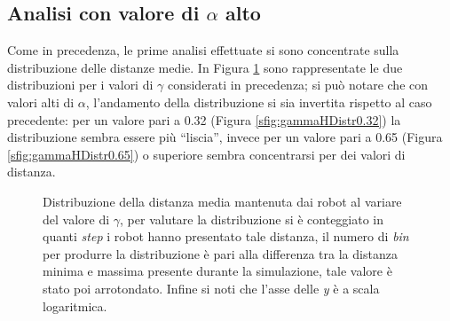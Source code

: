 \subsection{Analisi con valore di $\alpha$ alto}
\label{subsec:gammaahigh}
Come in precedenza, le prime analisi effettuate si sono concentrate sulla distribuzione delle distanze medie.
In Figura \ref{fig:gammaHDistr} sono rappresentate le due distribuzioni per i valori di $\gamma$ considerati in precedenza; si può notare che con valori alti di $\alpha$, l'andamento della distribuzione si sia invertita rispetto al caso precedente: per un valore pari a 0.32 (Figura \ref{sfig:gammaHDistr0.32}) la distribuzione sembra essere più “liscia”, invece per un valore pari a 0.65 (Figura \ref{sfig:gammaHDistr0.65}) o superiore sembra concentrarsi per dei valori di distanza.
\begin{figure}
	\hfill
	\caption{Distribuzione della distanza media mantenuta dai robot al variare del valore di $\gamma$, per valutare la distribuzione si è conteggiato in quanti \textit{step} i robot hanno presentato tale distanza, il numero di \textit{bin} per produrre la distribuzione è pari alla differenza tra la distanza minima e massima presente durante la simulazione, tale valore è stato poi arrotondato. Infine si noti che l'asse delle \textit{y} è a scala logaritmica.}
	\label{fig:gammaHDistr}
\end{figure}
